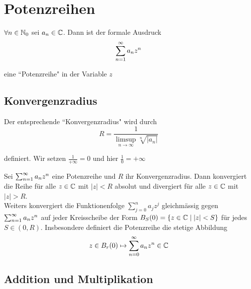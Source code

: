 \section{Potenzreihen}

\setcounter{thm}{53}
\begin{mydef}[Potenzreihe]
	$\forall n \in \mathbb{N}_0$ sei $a_n \in \mathbb{C}$. Dann ist der formale Ausdruck
	\begin{equation}
		\sum_{n=1}^{\infty} a_n z^n
	\end{equation}
	
	eine ``Potenzreihe" in der Variable $z$
\end{mydef}

\subsection{Konvergenzradius}

\begin{mydef}[Konvergenzradius]
	Der entsprechende ``Konvergenzradius" wird durch
	\begin{equation}
		R=\frac{1}{\limsup_{n \to \infty} \sqrt[n]{|a_n|}}
	\end{equation}
	
	definiert. Wir setzen $\frac{1}{+\infty} = 0$ und hier $\frac{1}{0} = +\infty$
\end{mydef}

\begin{thm}
	Sei $\sum_{n=1}^{\infty} a_n z^n$ eine Potenzreihe und $R$ ihr Konvergenzradius. Dann konvergiert die Reihe für alle $z \in \mathbb{C}$ mit $|z| < R$ absolut und divergiert für alle $z \in \mathbb{C}$ mit $|z| > R$. \\
	Weiters konvergiert die Funktionenfolge $\sum_{j=0}^{n} a_j z^j$ gleichmässig gegen $\sum_{n=1}^{\infty} a_n z^n$ auf jeder Kreisscheibe der Form $B_S(0) = \{ z \in \mathbb{C} \mid |z| < S\}$ für jedes $S\in (0, R)$. Insbesondere definiert die Potenzreihe die stetige Abbildung 
	\begin{equation}
		z \in B_r (0) \mapsto \sum_{n=0}^{\infty} a_n z^n \in \mathbb{C}
	\end{equation}
	
\end{thm}

\subsection{Addition und Multiplikation}

